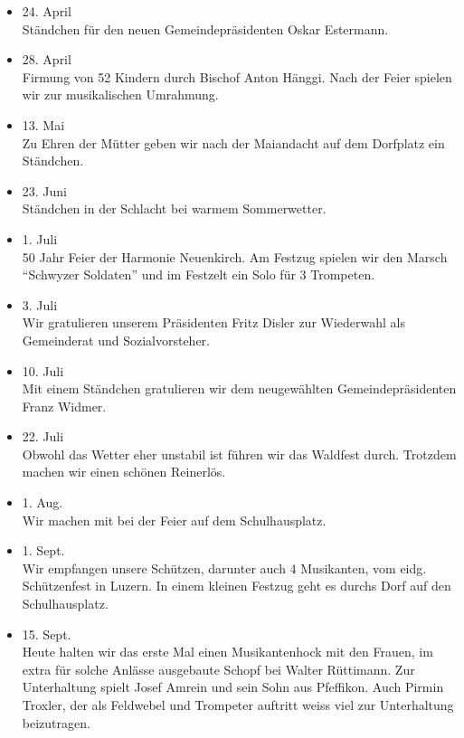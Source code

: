 \begin{history}
\begin{itemize}
        \item[]24. April\\
        Ständchen für den neuen Gemeindepräsidenten Oskar Estermann.

        \item[]28. April\\
        Firmung von 52 Kindern durch Bischof Anton Hänggi. Nach der Feier
        spielen wir zur musikalischen Umrahmung.

        \item[]13. Mai\\
        Zu Ehren der Mütter geben wir nach der Maiandacht auf dem Dorfplatz ein
        Ständchen.

        \item[]23. Juni\\
        Ständchen in der Schlacht bei warmem Sommerwetter.

        \item[]1. Juli\\
        50 Jahr Feier der Harmonie Neuenkirch. Am Festzug spielen wir den Marsch
        \enquote{Schwyzer Soldaten} und im Festzelt ein Solo für 3 Trompeten.

        \item[]3. Juli\\
        Wir gratulieren unserem Präsidenten Fritz Disler zur Wiederwahl als
        Gemeinderat und Sozialvorsteher.

        \item[]10. Juli\\
        Mit einem Ständchen gratulieren wir dem neugewählten Gemeindepräsidenten
        Franz Widmer.

        \item[]22. Juli\\
        Obwohl das Wetter eher unstabil ist führen wir das Waldfest durch.
        Trotzdem machen wir einen schönen Reinerlös.

        \item[]1. Aug.\\
        Wir machen mit bei der Feier auf dem Schulhausplatz.

        \item[]1. Sept.\\
        Wir empfangen unsere Schützen, darunter auch 4 Musikanten, vom eidg.
        Schützenfest in Luzern. In einem kleinen Festzug geht es durchs Dorf auf
        den Schulhausplatz.

        \item[]15. Sept.\\
        Heute halten wir das erste Mal einen Musikantenhock mit den Frauen, im
        extra für solche Anlässe ausgebaute Schopf bei Walter Rüttimann. Zur
        Unterhaltung spielt Josef Amrein und sein Sohn aus Pfeffikon. Auch
        Pirmin Troxler, der als Feldwebel und Trompeter auftritt weiss viel zur
        Unterhaltung beizutragen.


\end{itemize}
\end{history}
